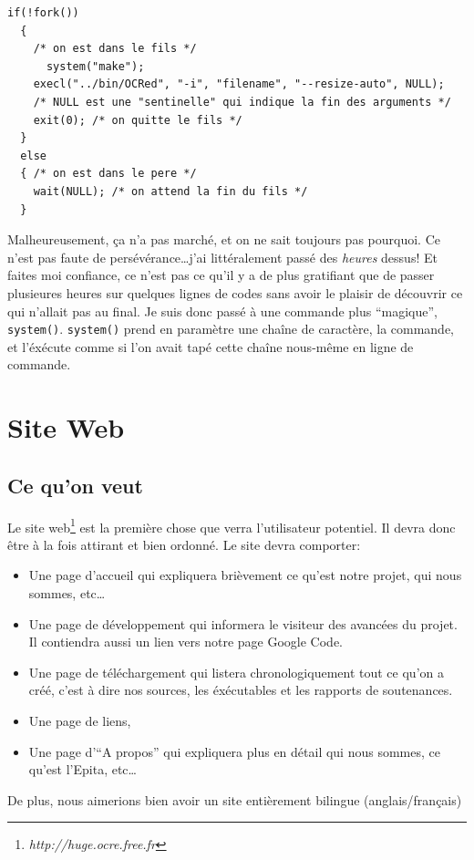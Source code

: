 \documentclass[a4paper,12pt]{report}
\newcommand{\url}[1]{\emph{#1}}
\begin{document}
\begin{lstlisting}
if(!fork())
  {
    /* on est dans le fils */
      system("make");  
    execl("../bin/OCRed", "-i", "filename", "--resize-auto", NULL);
    /* NULL est une "sentinelle" qui indique la fin des arguments */
    exit(0); /* on quitte le fils */
  }
  else
  { /* on est dans le pere */
    wait(NULL); /* on attend la fin du fils */
  }
\end{lstlisting}

Malheureusement, \c ca n'a pas march\'e, et on ne sait toujours pas pourquoi. Ce n'est pas faute de pers\'ev\'erance\ldots j'ai litt\'eralement pass\'e des \emph{heures} dessus! Et faites moi confiance, ce n'est pas ce qu'il y a de plus gratifiant que de passer plusieures heures sur quelques lignes de codes sans avoir le plaisir de d\'ecouvrir ce qui n'allait pas au final. Je suis donc pass\'e \`a une commande plus ``magique'', \verb!system()!. \verb!system()! prend en param\`etre une cha\^ine de caract\`ere, la commande, et l'\'ex\'ecute comme si l'on avait tap\'e cette cha\^ine nous-m\^eme en ligne de commande.

\chapter{Site Web} %
\label{cha:site_web}
	\section{Ce qu'on veut} %
	\label{sec:ce_qu_on_veut}
	Le site web\footnote{\url{http://huge.ocre.free.fr}} est la premi\`ere chose que verra l'utilisateur potentiel. Il devra donc \^etre \`a la fois attirant et bien ordonn\'e. Le site devra comporter:
	\begin{itemize}
		\item Une page d'accueil qui expliquera bri\`evement ce qu'est notre projet, qui nous sommes, etc\ldots
		\item Une page de d\'eveloppement qui informera le visiteur des avanc\'ees du projet. Il contiendra aussi un lien vers notre page Google Code.
		\item Une page de t\'el\'echargement qui listera chronologiquement tout ce qu'on a cr\'e\'e, c'est \`a dire nos sources, les \'ex\'ecutables et les rapports de soutenances.
		\item Une page de liens,
		\item Une page d'``A propos'' qui expliquera plus en d\'etail qui nous sommes, ce qu'est l'Epita, etc\ldots
	\end{itemize}
	De plus, nous aimerions bien avoir un site enti\`erement bilingue (anglais/fran\c cais)
	
\end{document}
